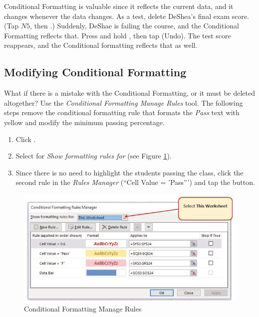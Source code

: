 Conditional Formatting is valuable since it reflects the current data, and it changes whenever the data changes. As a test, delete DeShea's final exam score. (Tap $ N5 $, then .) Suddenly, DeShae is failing the course, and the Conditional Formatting reflects that. Press and hold , then tap  (Undo). The test score reappears, and the Conditional formatting reflects that as well.

\subsection{Modifying Conditional Formatting}

What if there is a mistake with the Conditional Formatting, or it must be deleted altogether? Use the \textit{Conditional Formatting Manage Rules} tool. The following steps remove the conditional formatting rule that formats the \textit{Pass} text with yellow and modify the minimum passing percentage.

\begin{enumbox}
	\begin{enumerate}
		\item Click . 
		\item Select  for \textit{Show formatting rules for} (see Figure \ref{03:fig23}).
		\item Since there is no need to highlight the students passing the class, click the second rule in the \textit{Rules Manager} (``Cell Value = 'Pass''') and tap the  button.
	\end{enumerate}
\end{enumbox}
	
\begin{figure}[H]
	\centering
	\includegraphics[width=\maxwidth{.95\linewidth}]{gfx/ch03_fig23}
	\caption{Conditional Formatting Manage Rules}
	\label{03:fig23}
\end{figure}

